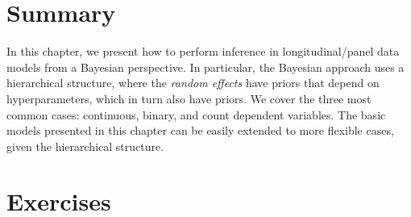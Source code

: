 \section{Summary}\label{sec94}
In this chapter, we present how to perform inference in longitudinal/panel data models from a Bayesian perspective. In particular, the Bayesian approach uses a hierarchical structure, where the \textit{random effects} have priors that depend on hyperparameters, which in turn also have priors. We cover the three most common cases: continuous, binary, and count dependent variables. The basic models presented in this chapter can be easily extended to more flexible cases, given the hierarchical structure.

\section{Exercises}\label{sec95}

